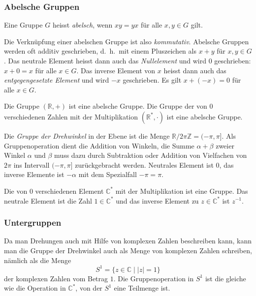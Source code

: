 %
%
\subsubsection{Abelsche Gruppen}
\begin{definition}
\label{buch:gruppen:definition:abelsch}
Eine Gruppe $G$ heisst {\em abelsch}, wenn 
$xy=yx$ für alle $x,y\in G$ gilt.
\end{definition}

Die Verknüpfung einer abelschen Gruppe ist also {\em kommutativ}.
%
Abelsche Gruppen werden oft additiv geschrieben, d.~h.~mit einem
Pluszeichen als $x+y$ für $x,y\in G$.
Das neutrale Element heisst dann auch das {\em Nullelement} und wird $0$
geschrieben: $x+0=x$ für alle $x\in G$.
Das inverse Element von $x$ heisst dann auch das
{\em entgegengesetzte Element} und wird $-x$ geschrieben. 
Es gilt $x+(-x)=0$ für alle $x\in G$.

\begin{beispiel}
Die Gruppe $(\mathbb{R},+)$ ist eine abelsche Gruppe.
Die Gruppe der von $0$ verschiedenen Zahlen mit der Multiplikation
$(\mathbb{R}^*,\cdot)$ ist eine abelsche Gruppe.
\end{beispiel}

\begin{beispiel}
Die {\em Gruppe der Drehwinkel} in der Ebene ist die Menge
\(
\mathbb{R}/2\pi\mathbb{Z}
=
(-\pi,\pi].
\)
Als Gruppenoperation dient die Addition von Winkeln, die Summe
$\alpha+\beta$ zweier Winkel $\alpha$ und $\beta$ muss dazu durch
Subtraktion oder Addition von Vielfachen von $2\pi$ ins Intervall
$(-\pi,\pi]$ zurückgebracht werden.
Neutrales Element ist $0$, das inverse Elemente ist $-\alpha$ mit
dem Spezialfall $-\pi=\pi$.
\end{beispiel}

\begin{beispiel}
Die von $0$ verschiedenen Element $\mathbb{C}^*$ mit der Multiplikation
ist eine Gruppe.
Das neutrale Element ist die Zahl $1\in\mathbb{C}^*$ und das inverse
Element zu $z\in\mathbb{C}^*$ ist $z^{-1}$.
\end{beispiel}

%
%
\subsubsection{Untergruppen}
Da man Drehungen auch mit Hilfe von komplexen Zahlen beschreiben kann,
kann man die Gruppe der Drehwinkel auch als Menge von komplexen Zahlen
schreiben, nämlich als die Menge
\[
S^1
=
\{z\in\mathbb{C}\mid |z|=1\}
\]
der komplexen Zahlen vom Betrag $1$.
Die Gruppenoperation in $S^1$ ist die gleiche wie die Operation
in $\mathbb{C}^*$, von der $S^1$ eine Teilmenge ist.

